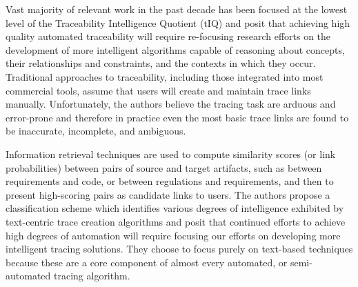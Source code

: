 \documentclass{report}
\begin{document}
Vast majority of relevant work in the past decade has been focused at the lowest level of the
Traceability Intelligence Quotient (tIQ) and posit that achieving high quality automated traceability
will require re-focusing research efforts on the development of more intelligent algorithms capable
of reasoning about concepts, their relationships and constraints, and the contexts in which they occur.
Traditional approaches to traceability, including those integrated into most commercial tools,
assume that users will create and maintain trace links manually. Unfortunately, the authors believe
the tracing task are arduous and error-prone and therefore in practice even the most basic trace links
are found to be inaccurate, incomplete, and ambiguous.

Information retrieval techniques are used to compute similarity scores (or link probabilities) between
pairs of source and target artifacts, such as between requirements and code, or between regulations and
requirements, and then to present high-scoring pairs as candidate links to users. The authors propose a
classification scheme which identifies various degrees of intelligence exhibited by text-centric trace 
creation algorithms and posit that continued efforts to achieve high degrees of automation will require
focusing our efforts on developing more intelligent tracing solutions. They choose to focus purely on 
text-based techniques because these are a core component of almost every automated, or semi-automated
tracing algorithm.
\end{document}
